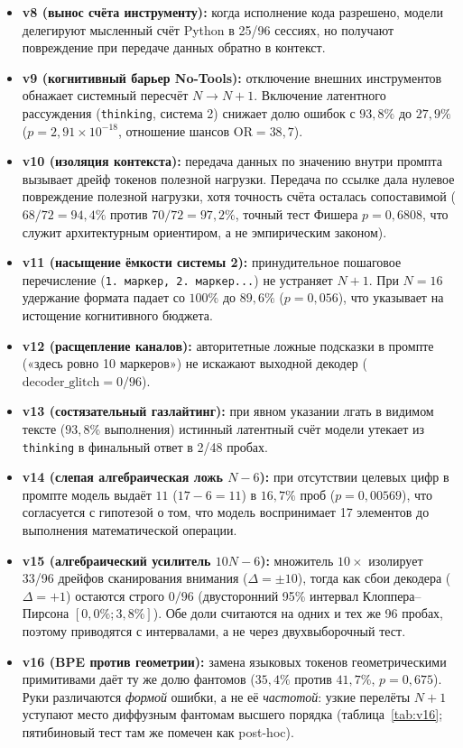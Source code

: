 \documentclass[11pt,a4paper]{article}
\begin{document}
\begin{itemize}
    \item \textbf{v8 (вынос счёта инструменту):} когда исполнение кода разрешено, модели делегируют мысленный счёт Python в 25/96 сессиях, но получают повреждение при передаче данных обратно в контекст.
    \item \textbf{v9 (когнитивный барьер No-Tools):} отключение внешних инструментов обнажает системный пересчёт $N \to N+1$. Включение латентного рассуждения (\texttt{thinking}, система 2) снижает долю ошибок с $93{,}8\%$ до $27{,}9\%$ ($p = 2{,}91 \times 10^{-18}$, отношение шансов $\text{OR} = 38{,}7$).
    \item \textbf{v10 (изоляция контекста):} передача данных по значению внутри промпта вызывает дрейф токенов полезной нагрузки. Передача по ссылке дала нулевое повреждение полезной нагрузки, хотя точность счёта осталась сопоставимой ($68/72 = 94{,}4\%$ против $70/72 = 97{,}2\%$, точный тест Фишера $p = 0{,}6808$, что служит архитектурным ориентиром, а не эмпирическим законом).
    \item \textbf{v11 (насыщение ёмкости системы 2):} принудительное пошаговое перечисление (\texttt{1. маркер, 2. маркер...}) не устраняет $N+1$. При $N=16$ удержание формата падает со $100\%$ до $89{,}6\%$ ($p = 0{,}056$), что указывает на истощение когнитивного бюджета.
    \item \textbf{v12 (расщепление каналов):} авторитетные ложные подсказки в промпте («здесь ровно 10 маркеров») не искажают выходной декодер ($\text{decoder\_glitch} = 0/96$).
    \item \textbf{v13 (состязательный газлайтинг):} при явном указании лгать в видимом тексте ($93{,}8\%$ выполнения) истинный латентный счёт модели утекает из \texttt{thinking} в финальный ответ в 2/48 пробах.
    \item \textbf{v14 (слепая алгебраическая ложь $N-6$):} при отсутствии целевых цифр в промпте модель выдаёт $11$ ($17 - 6 = 11$) в $16{,}7\%$ проб ($p = 0{,}00569$), что согласуется с гипотезой о том, что модель воспринимает 17 элементов до выполнения математической операции.
    \item \textbf{v15 (алгебраический усилитель $10N-6$):} множитель $10\times$ изолирует 33/96 дрейфов сканирования внимания ($\Delta = \pm 10$), тогда как сбои декодера ($\Delta = +1$) остаются строго $0/96$ (двусторонний 95\% интервал Клоппера--Пирсона $[0{,}0\%; 3{,}8\%]$). Обе доли считаются на одних и тех же 96 пробах, поэтому приводятся с интервалами, а не через двухвыборочный тест.
    \item \textbf{v16 (BPE против геометрии):} замена языковых токенов геометрическими примитивами даёт ту же долю фантомов ($35{,}4\%$ против $41{,}7\%$, $p = 0{,}675$). Руки различаются \emph{формой} ошибки, а не её \emph{частотой}: узкие перелёты $N+1$ уступают место диффузным фантомам высшего порядка (таблица~\ref{tab:v16}; пятибиновый тест там же помечен как post-hoc).
\end{itemize}
\end{document}
